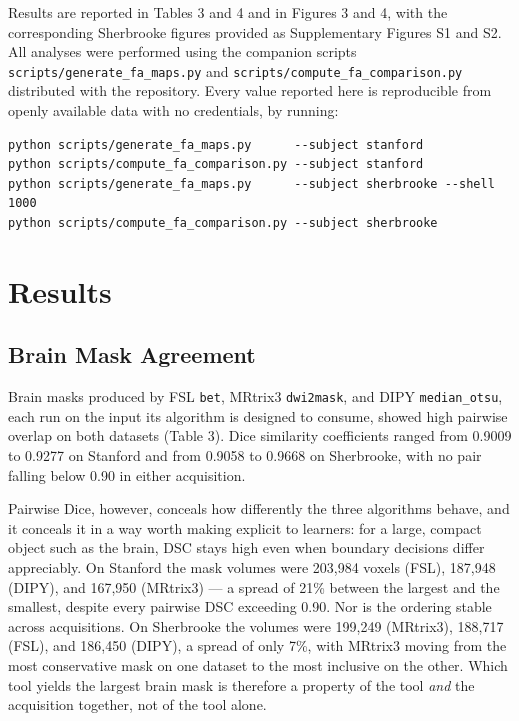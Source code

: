 \documentclass[12pt,a4paper]{article}
\begin{document}
Results are reported in Tables 3 and 4 and in Figures 3 and 4, with the corresponding Sherbrooke figures provided as Supplementary Figures S1 and S2. All analyses were performed using the companion scripts \texttt{scripts/generate\_fa\_maps.py} and \texttt{scripts/compute\_fa\_comparison.py} distributed with the repository. Every value reported here is reproducible from openly available data with no credentials, by running:

\begin{verbatim}
python scripts/generate_fa_maps.py      --subject stanford
python scripts/compute_fa_comparison.py --subject stanford
python scripts/generate_fa_maps.py      --subject sherbrooke --shell 1000
python scripts/compute_fa_comparison.py --subject sherbrooke
\end{verbatim}

\section{Results}\label{results}

\subsection{Brain Mask Agreement}\label{brain-mask-agreement}

Brain masks produced by FSL \texttt{bet}, MRtrix3 \texttt{dwi2mask}, and DIPY \texttt{median\_otsu}, each run on the input its algorithm is designed to consume, showed high pairwise overlap on both datasets (Table 3). Dice similarity coefficients ranged from 0.9009 to 0.9277 on Stanford and from 0.9058 to 0.9668 on Sherbrooke, with no pair falling below 0.90 in either acquisition.

Pairwise Dice, however, conceals how differently the three algorithms behave, and it conceals it in a way worth making explicit to learners: for a large, compact object such as the brain, DSC stays high even when boundary decisions differ appreciably. On Stanford the mask volumes were 203,984 voxels (FSL), 187,948 (DIPY), and 167,950 (MRtrix3) --- a spread of 21\% between the largest and the smallest, despite every pairwise DSC exceeding 0.90. Nor is the ordering stable across acquisitions. On Sherbrooke the volumes were 199,249 (MRtrix3), 188,717 (FSL), and 186,450 (DIPY), a spread of only 7\%, with MRtrix3 moving from the most conservative mask on one dataset to the most inclusive on the other. Which tool yields the largest brain mask is therefore a property of the tool \emph{and} the acquisition together, not of the tool alone.
\end{document}
